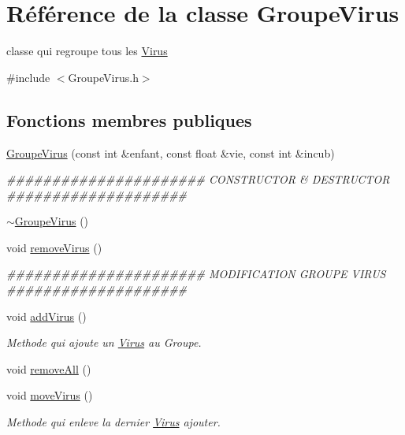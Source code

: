 \hypertarget{classGroupeVirus}{
\section{Référence de la classe GroupeVirus}
\label{classGroupeVirus}
}


classe qui regroupe tous les \hyperlink{classVirus}{Virus}  




{\ttfamily \#include $<$GroupeVirus.h$>$}

\subsection*{Fonctions membres publiques}
\begin{DoxyCompactItemize}
\item 
\hyperlink{classGroupeVirus_a0f26b16e8171cdafb3c7577f51b7ddaf}{GroupeVirus} (const int \&enfant, const float \&vie, const int \&incub)
\begin{DoxyCompactList}\small\item\em \#\#\#\#\#\#\#\#\#\#\#\#\#\#\#\#\#\#\#\#\#\# CONSTRUCTOR \& DESTRUCTOR \#\#\#\#\#\#\#\#\#\#\#\#\#\#\#\#\#\#\#\# \end{DoxyCompactList}\item 
\hyperlink{classGroupeVirus_a8bd8126e452e67452e61ef84c48b7416}{$\sim$GroupeVirus} ()
\item 
void \hyperlink{classGroupeVirus_ad64c0fbeade88ec9781bd04bc7b316aa}{removeVirus} ()
\begin{DoxyCompactList}\small\item\em \#\#\#\#\#\#\#\#\#\#\#\#\#\#\#\#\#\#\#\#\#\# MODIFICATION GROUPE VIRUS \#\#\#\#\#\#\#\#\#\#\#\#\#\#\#\#\#\#\#\# \end{DoxyCompactList}\item 
void \hyperlink{classGroupeVirus_a8362321581e32c76c12414dc200b1def}{addVirus} ()
\begin{DoxyCompactList}\small\item\em Methode qui ajoute un \hyperlink{classVirus}{Virus} au Groupe. \end{DoxyCompactList}\item 
void \hyperlink{classGroupeVirus_a20d1651696c2c5b4d31acda0a025641a}{removeAll} ()
\item 
void \hyperlink{classGroupeVirus_a3b45316246cc791e2482d3d79849ab29}{moveVirus} ()
\begin{DoxyCompactList}\small\item\em Methode qui enleve la dernier \hyperlink{classVirus}{Virus} ajouter. \end{DoxyCompactList}\item 

\end{DoxyCompactItemize}
